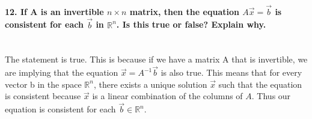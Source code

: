 \documentclass{report}
\begin{document}
\paragraph{12. If A is an invertible $ n \times n $ matrix, then the equation $ A \vec{ x }= \vec{ b } $ is consistent for each $ \vec{ b }  $ in $ \mathbb{R}^{ n } $. Is this true or false? Explain why. \\ \\}
The statement is true. This is because if we have a matrix A that is invertible, we are implying that the equation $ \vec{ x } = A^{ -1 }\vec{ b } $ is also true. This means that for every vector b in the space $ \mathbb{R}^{ n } $, there exists a unique solution $ \vec{ x } $ such that the equation is consistent because $ \vec{ x } $ is a linear combination of the columns of $ A $. Thus our equation is consistent for each $ \vec{ b } \in \mathbb{R}^{ n }$.
\end{document}
